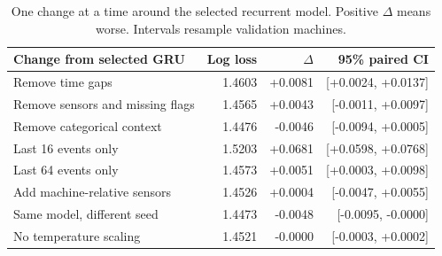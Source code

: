 \begin{table}[htbp]
\centering\small
\begin{tabular}{@{}lrrr@{}}
\toprule
Change from selected GRU & Log loss & $\Delta$ & 95\% paired CI \\
\midrule
Remove time gaps & 1.4603 & +0.0081 & [+0.0024, +0.0137] \\
Remove sensors and missing flags & 1.4565 & +0.0043 & [-0.0011, +0.0097] \\
Remove categorical context & 1.4476 & -0.0046 & [-0.0094, +0.0005] \\
Last 16 events only & 1.5203 & +0.0681 & [+0.0598, +0.0768] \\
Last 64 events only & 1.4573 & +0.0051 & [+0.0003, +0.0098] \\
Add machine-relative sensors & 1.4526 & +0.0004 & [-0.0047, +0.0055] \\
Same model, different seed & 1.4473 & -0.0048 & [-0.0095, -0.0000] \\
No temperature scaling & 1.4521 & -0.0000 & [-0.0003, +0.0002] \\
\bottomrule
\end{tabular}
\caption{One change at a time around the selected recurrent model. Positive $\Delta$ means worse. Intervals resample validation machines.}
\end{table}

